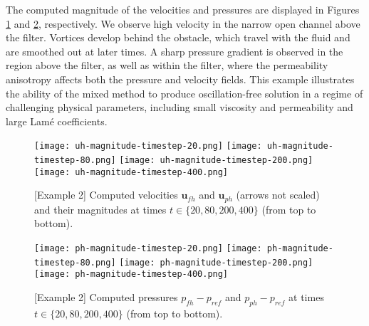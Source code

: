 \documentclass[11pt]{article}
\numberwithin{equation}{section}
\newcommand{\bu}{\mathbf{u}}
\newcommand{\0}{{\mathbf{0}}}
\numberwithin{equation}{section}
\begin{document}
The computed magnitude of the velocities and pressures are displayed in Figures \ref{fig:filter-velocity} and \ref{fig:filter-pressure}, respectively. We observe high velocity in the narrow open channel above the filter. Vortices develop behind the obstacle, which travel with the fluid and are smoothed out at later times. A sharp pressure gradient is observed in the region above the filter, as well as within the filter, where the permeability anisotropy affects both the pressure and velocity fields. This example illustrates the ability of the mixed method to produce oscillation-free solution in a regime of challenging physical parameters, including small viscosity and permeability and large Lam\'e coefficients. 
\begin{figure}[ht]
\texttt{[image: uh-magnitude-timestep-20.png]}
\texttt{[image: uh-magnitude-timestep-80.png]}
\texttt{[image: uh-magnitude-timestep-200.png]}
\texttt{[image: uh-magnitude-timestep-400.png]}
\vspace{-0.4cm}
\caption{[Example 2] Computed velocities $\bu_{fh}$ and $\bu_{ph}$ (arrows not scaled) and their magnitudes at times $t\in \{ 20, 80, 200, 400 \}$ (from top to bottom).} \label{fig:filter-velocity}
\end{figure}

\begin{figure}[ht]
\texttt{[image: ph-magnitude-timestep-20.png]}
\texttt{[image: ph-magnitude-timestep-80.png]}
\texttt{[image: ph-magnitude-timestep-200.png]}	
\texttt{[image: ph-magnitude-timestep-400.png]}
\vspace{-0.4cm}
\caption{[Example 2] Computed pressures $p_{fh} - p_{ref}$ and $p_{ph} - p_{ref}$ at times $t\in \{ 20, 80, 200, 400 \}$ (from top to bottom).} \label{fig:filter-pressure}
\end{figure}




\end{document}
